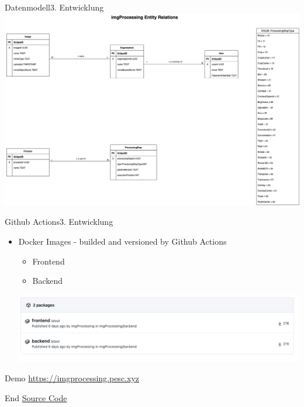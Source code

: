 \documentclass[aspectratio=169,20pt]{beamer}
\begin{document}
\begin{frame}{Datenmodell}{3. Entwicklung}
	\includegraphics[scale=0.40]{db_model}	
\end{frame}

\begin{frame}{Github Actions}{3. Entwicklung}
	\begin{itemize}
		\item{Docker Images - builded and versioned by Github Actions}
		\begin{itemize}
			\item{Frontend}
			\item{Backend}
		\end{itemize}
		\includegraphics[scale=0.8]{action}
	\end{itemize}
\end{frame}

\begin{frame}{Demo}{}
	\href{https://imgprocessing.pesc.xyz/}{https://imgprocessing.pesc.xyz}
\end{frame}

\begin{frame}{End}{}
	\href{https://github.com/imgProcessing/backend}{Source Code}
\end{frame}
\end{document}
